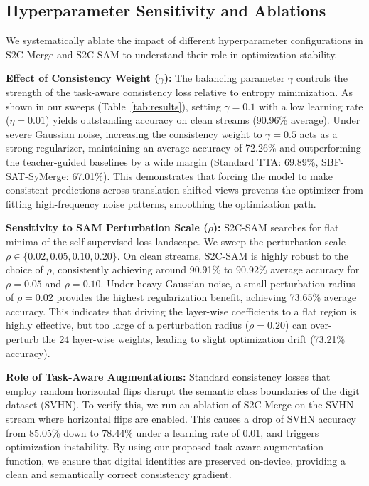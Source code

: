 \documentclass{article}
\theoremstyle{plain}
\theoremstyle{definition}
\theoremstyle{remark}
\begin{document}
\vspace{-4pt}
\subsection{Hyperparameter Sensitivity and Ablations}
We systematically ablate the impact of different hyperparameter configurations in S2C-Merge and S2C-SAM to understand their role in optimization stability.

\textbf{Effect of Consistency Weight ($\gamma$):}
The balancing parameter $\gamma$ controls the strength of the task-aware consistency loss relative to entropy minimization. As shown in our sweeps (Table~\ref{tab:results}), setting $\gamma=0.1$ with a low learning rate ($\eta=0.01$) yields outstanding accuracy on clean streams (90.96\% average). Under severe Gaussian noise, increasing the consistency weight to $\gamma=0.5$ acts as a strong regularizer, maintaining an average accuracy of 72.26\% and outperforming the teacher-guided baselines by a wide margin (Standard TTA: 69.89\%, SBF-SAT-SyMerge: 67.01\%). This demonstrates that forcing the model to make consistent predictions across translation-shifted views prevents the optimizer from fitting high-frequency noise patterns, smoothing the optimization path.

\textbf{Sensitivity to SAM Perturbation Scale ($\rho$):}
S2C-SAM searches for flat minima of the self-supervised loss landscape. We sweep the perturbation scale $\rho \in \{0.02, 0.05, 0.10, 0.20\}$. On clean streams, S2C-SAM is highly robust to the choice of $\rho$, consistently achieving around 90.91\% to 90.92\% average accuracy for $\rho=0.05$ and $\rho=0.10$. Under heavy Gaussian noise, a small perturbation radius of $\rho=0.02$ provides the highest regularization benefit, achieving 73.65\% average accuracy. This indicates that driving the layer-wise coefficients to a flat region is highly effective, but too large of a perturbation radius ($\rho=0.20$) can over-perturb the 24 layer-wise weights, leading to slight optimization drift (73.21\% accuracy).

\textbf{Role of Task-Aware Augmentations:}
Standard consistency losses that employ random horizontal flips disrupt the semantic class boundaries of the digit dataset (SVHN). To verify this, we run an ablation of S2C-Merge on the SVHN stream where horizontal flips are enabled. This causes a drop of SVHN accuracy from 85.05\% down to 78.44\% under a learning rate of 0.01, and triggers optimization instability. By using our proposed task-aware augmentation function, we ensure that digital identities are preserved on-device, providing a clean and semantically correct consistency gradient.
\end{document}
